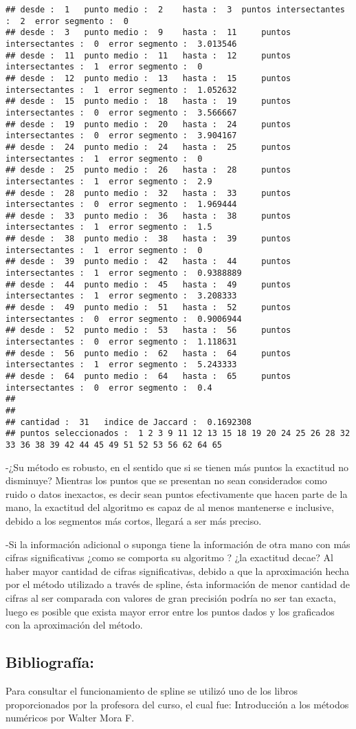 \documentclass[]{article}
\begin{document}
\begin{verbatim}
## desde :  1   punto medio :  2    hasta :  3  puntos intersectantes :  2  error segmento :  0 
## desde :  3   punto medio :  9    hasta :  11     puntos intersectantes :  0  error segmento :  3.013546 
## desde :  11  punto medio :  11   hasta :  12     puntos intersectantes :  1  error segmento :  0 
## desde :  12  punto medio :  13   hasta :  15     puntos intersectantes :  1  error segmento :  1.052632 
## desde :  15  punto medio :  18   hasta :  19     puntos intersectantes :  0  error segmento :  3.566667 
## desde :  19  punto medio :  20   hasta :  24     puntos intersectantes :  0  error segmento :  3.904167 
## desde :  24  punto medio :  24   hasta :  25     puntos intersectantes :  1  error segmento :  0 
## desde :  25  punto medio :  26   hasta :  28     puntos intersectantes :  1  error segmento :  2.9 
## desde :  28  punto medio :  32   hasta :  33     puntos intersectantes :  0  error segmento :  1.969444 
## desde :  33  punto medio :  36   hasta :  38     puntos intersectantes :  1  error segmento :  1.5 
## desde :  38  punto medio :  38   hasta :  39     puntos intersectantes :  1  error segmento :  0 
## desde :  39  punto medio :  42   hasta :  44     puntos intersectantes :  1  error segmento :  0.9388889 
## desde :  44  punto medio :  45   hasta :  49     puntos intersectantes :  1  error segmento :  3.208333 
## desde :  49  punto medio :  51   hasta :  52     puntos intersectantes :  0  error segmento :  0.9006944 
## desde :  52  punto medio :  53   hasta :  56     puntos intersectantes :  0  error segmento :  1.118631 
## desde :  56  punto medio :  62   hasta :  64     puntos intersectantes :  1  error segmento :  5.243333 
## desde :  64  punto medio :  64   hasta :  65     puntos intersectantes :  0  error segmento :  0.4 
## 
## 
## cantidad :  31   indice de Jaccard :  0.1692308 
## puntos seleccionados :  1 2 3 9 11 12 13 15 18 19 20 24 25 26 28 32 33 36 38 39 42 44 45 49 51 52 53 56 62 64 65
\end{verbatim}

-¿Su método es robusto, en el sentido que si se tienen más puntos la
exactitud no disminuye? Mientras los puntos que se presentan no sean
considerados como ruido o datos inexactos, es decir sean puntos
efectivamente que hacen parte de la mano, la exactitud del algoritmo es
capaz de al menos mantenerse e inclusive, debido a los segmentos más
cortos, llegará a ser más preciso.

-Si la información adicional o suponga tiene la información de otra mano
con más cifras significativas ¿como se comporta su algoritmo ? ¿la
exactitud decae? Al haber mayor cantidad de cifras significativas,
debido a que la aproximación hecha por el método utilizado a través de
spline, ésta información de menor cantidad de cifras al ser comparada
con valores de gran precisión podría no ser tan exacta, luego es posible
que exista mayor error entre los puntos dados y los graficados con la
aproximación del método.

\subsection{Bibliografía:}\label{bibliografia}

Para consultar el funcionamiento de spline se utilizó uno de los libros
proporcionados por la profesora del curso, el cual fue: Introducción a
los métodos numéricos por Walter Mora F.
\end{document}
